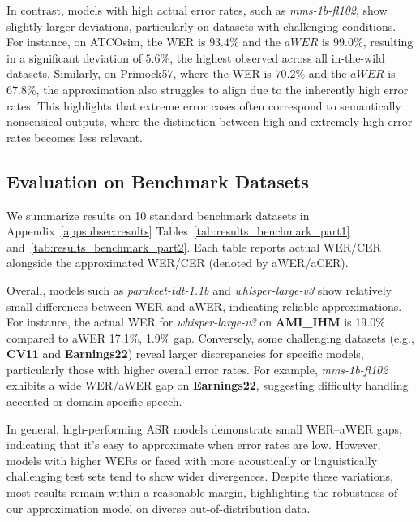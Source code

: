 In contrast, models with high actual error rates, such as \textit{mms-1b-fl102}, show slightly larger deviations, particularly on datasets with challenging conditions. For instance, on ATCOsim, the WER is \(93.4\%\) and the \(aWER\) is \(99.0\%\), resulting in a significant deviation of \(5.6\%\), the highest observed across all in-the-wild datasets. Similarly, on Primock57, where the WER is \(70.2\%\) and the \(aWER\) is \(67.8\%\), the approximation also struggles to align due to the inherently high error rates. This highlights that extreme error cases often correspond to semantically nonsensical outputs, where the distinction between high and extremely high error rates becomes less relevant. 





\subsection{Evaluation on Benchmark Datasets}\label{subsec:benchmark_eval}
We summarize results on 10 standard benchmark datasets in Appendix~\ref{appsubsec:results} Tables~\ref{tab:results_benchmark_part1} and~\ref{tab:results_benchmark_part2}. Each table reports actual WER/CER alongside the approximated WER/CER (denoted by aWER/aCER). 




Overall, models such as \textit{parakeet-tdt-1.1b} and \textit{whisper-large-v3} show relatively small differences between WER and aWER, indicating reliable approximations. For instance,  the actual WER for \textit{whisper-large-v3} on \textbf{AMI\_IHM} is 19.0\% compared to aWER 17.1\%, 1.9\% gap. Conversely, some challenging datasets (e.g., \textbf{CV11} and \textbf{Earnings22}) reveal larger discrepancies for specific models, particularly those with higher overall error rates. For example, \textit{mms-1b-fl102} exhibits a wide WER/aWER gap on \textbf{Earnings22}, suggesting difficulty handling accented or domain-specific speech. 




In general, high-performing ASR models demonstrate small WER–aWER gaps, indicating that it's easy to approximate when error rates are low. However, models with higher WERs or faced with more acoustically or linguistically challenging test sets tend to show wider divergences. Despite these variations, most results remain within a reasonable margin, highlighting the robustness of our approximation model on diverse out-of-distribution data.

